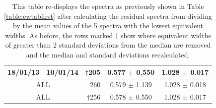 {\begin{table}[!htbp]
{\begin{tabular}{|l|l|r|c|c|}
18/01/13 & 10/01/14 & $\dagger$205 & 0.577 $ \pm $ 0.550 & 1.028 $ \pm $ 0.017 \\\hline
\multicolumn{2}{|c|}{ALL} & 260 & 0.579 $ \pm $ 1.139 & 1.028 $ \pm $ 0.018 \\\hline
\multicolumn{2}{|c|}{ALL} & $\dagger$256 & 0.578 $ \pm $ 0.550 & 1.028 $ \pm $ 0.017 \\\hline
\end{tabular}}
\caption{This table re-displays the {\harps} spectra as previously shown in Table \ref{table:ewtabfirst} after
  calculating the residual spectra from dividing by the mean values of the 5 spectra with the lowest equivalent
  widths. As before, the rows marked {$\dagger$} show where equivalent   widths of greater  than 2 standard deviations
  from the median are removed and the median and standard deviations recalculated.}
\protect\label{table:divcompar}
\end{table}}

